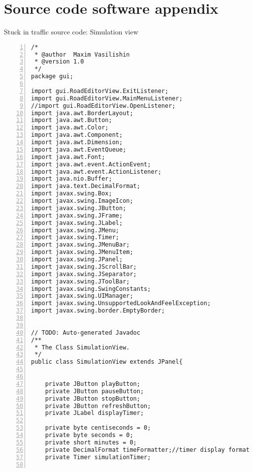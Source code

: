 \newpage
\section*{Source code software appendix} %


Stuck in traffic source code: Simulation view %

\lstset{language=Java, framexleftmargin=0pt, framexrightmargin=10pt, frame=single, breaklines=true, }          %

\begin{lstlisting}[numbers=left, numberstyle=\small, numbersep=8pt,  framexleftmargin=1pt, framexrightmargin=10pt ]  % Start your code-block
/*
 * @author  Maxim Vasilishin
 * @version 1.0
 */
package gui;

import gui.RoadEditorView.ExitListener;
import gui.RoadEditorView.MainMenuListener;
//import gui.RoadEditorView.OpenListener;
import java.awt.BorderLayout;
import java.awt.Button;
import java.awt.Color;
import java.awt.Component;
import java.awt.Dimension;
import java.awt.EventQueue;
import java.awt.Font;
import java.awt.event.ActionEvent;
import java.awt.event.ActionListener;
import java.nio.Buffer;
import java.text.DecimalFormat;
import javax.swing.Box;
import javax.swing.ImageIcon;
import javax.swing.JButton;
import javax.swing.JFrame;
import javax.swing.JLabel;
import javax.swing.JMenu;
import javax.swing.Timer;
import javax.swing.JMenuBar;
import javax.swing.JMenuItem;
import javax.swing.JPanel;
import javax.swing.JScrollBar;
import javax.swing.JSeparator;
import javax.swing.JToolBar;
import javax.swing.SwingConstants;
import javax.swing.UIManager;
import javax.swing.UnsupportedLookAndFeelException;
import javax.swing.border.EmptyBorder;


// TODO: Auto-generated Javadoc
/**
 * The Class SimulationView.
 */
public class SimulationView extends JPanel{

	
    private JButton playButton;
	private JButton pauseButton;
	private JButton stopButton;	
	private JButton refreshButton;
	private JLabel displayTimer;

    private byte centiseconds = 0;
    private byte seconds = 0;
    private short minutes = 0;
    private DecimalFormat timeFormatter;//timer display format
    private Timer simulationTimer;
    

\end{lstlisting}
